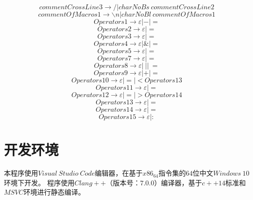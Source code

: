 \documentclass[UTF8]{ctexart}
\begin{document}
\begin{equation}
	commentCrossLine3 \rightarrow / | charNoBs \ commentCrossLine2
\end{equation}
\begin{equation}
	commentOfMacros1 \rightarrow \backslash n | charNoBl \ commentOfMacros1
\end{equation}
\begin{equation}
	Operators1 \rightarrow \varepsilon | - | =
\end{equation}
\begin{equation}
	Operators2 \rightarrow \varepsilon | =
\end{equation}
\begin{equation}
	Operators3 \rightarrow \varepsilon | =
\end{equation}
\begin{equation}
	Operators4 \rightarrow \varepsilon | \& | =
\end{equation}
\begin{equation}
	Operators5 \rightarrow \varepsilon | =
\end{equation}
\begin{equation}
	Operators7 \rightarrow \varepsilon | =
\end{equation}
\begin{equation}
	Operators8 \rightarrow \varepsilon | \ | | \ =
\end{equation}
\begin{equation}
	Operators9 \rightarrow \varepsilon | + | =
\end{equation}
\begin{equation}
	Operators10 \rightarrow \varepsilon | = | < Operators13
\end{equation}
\begin{equation}
	Operators11 \rightarrow \varepsilon | =
\end{equation}
\begin{equation}
	Operators12 \rightarrow \varepsilon | = | > Operators14
\end{equation}
\begin{equation}
	Operators13 \rightarrow \varepsilon | =
\end{equation}
\begin{equation}
	Operators14 \rightarrow \varepsilon | =
\end{equation}
\begin{equation}
	Operators15 \rightarrow \varepsilon | \colon
\end{equation}
\section{开发环境}
本程序使用$Visual \ Studio \ Code$编辑器，在基于$x86_64$指令集的$64$位中文$Windows \ 10$环境下开发。
程序使用$Clang++$（版本号：$7.0.0$）编译器，基于$c++14$标准和$MSVC$环境进行静态编译。
\end{document}
